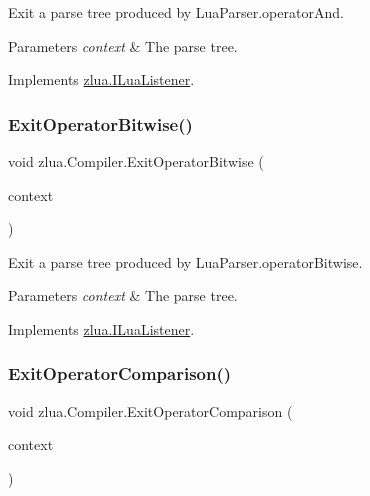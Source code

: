 Exit a parse tree produced by Lua\+Parser.\+operator\+And. 


\begin{DoxyParams}{Parameters}
{\em context} & The parse tree.\\
\hline
\end{DoxyParams}


Implements \mbox{\hyperlink{interfacezlua_1_1_i_lua_listener_a5b2a0ab0a1e41daa744680bd657adfa8}{zlua.\+I\+Lua\+Listener}}.

\mbox{\label{classzlua_1_1_compiler_ac96911516696a03a45807348f6338b41}} 
\subsubsection{\texorpdfstring{Exit\+Operator\+Bitwise()}{ExitOperatorBitwise()}}
{\footnotesize\ttfamily void zlua.\+Compiler.\+Exit\+Operator\+Bitwise (\begin{DoxyParamCaption}\item[{\mbox{[}\+Not\+Null\mbox{]} \mbox{\hyperlink{classzlua_1_1_lua_parser_1_1_operator_bitwise_context}{Lua\+Parser.\+Operator\+Bitwise\+Context}}}]{context }\end{DoxyParamCaption})}



Exit a parse tree produced by Lua\+Parser.\+operator\+Bitwise. 


\begin{DoxyParams}{Parameters}
{\em context} & The parse tree.\\
\hline
\end{DoxyParams}


Implements \mbox{\hyperlink{interfacezlua_1_1_i_lua_listener_ab567120e6d7258b74d7f88c14d6cf3c3}{zlua.\+I\+Lua\+Listener}}.

\mbox{\label{classzlua_1_1_compiler_af08a21dc48be4131cee4560b260d09c2}} 
\subsubsection{\texorpdfstring{Exit\+Operator\+Comparison()}{ExitOperatorComparison()}}
{\footnotesize\ttfamily void zlua.\+Compiler.\+Exit\+Operator\+Comparison (\begin{DoxyParamCaption}\item[{\mbox{[}\+Not\+Null\mbox{]} \mbox{\hyperlink{classzlua_1_1_lua_parser_1_1_operator_comparison_context}{Lua\+Parser.\+Operator\+Comparison\+Context}}}]{context }\end{DoxyParamCaption})}



